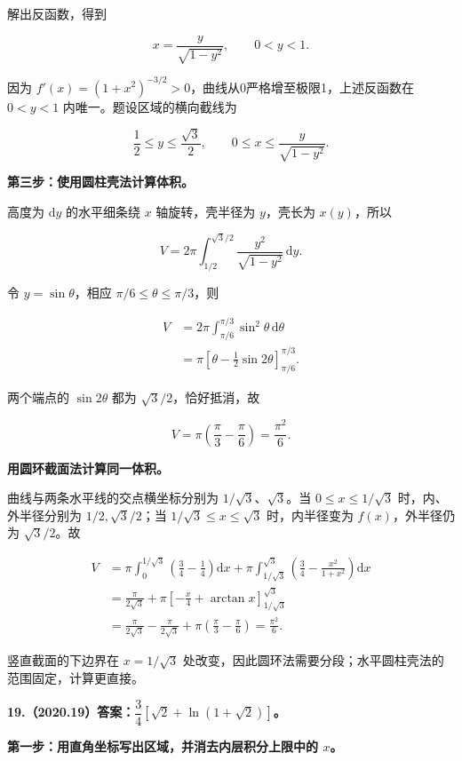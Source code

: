 \documentclass[UTF8,11pt,fontset=windows]{ctexart}
\begin{document}
解出反函数，得到

$$
x=\frac{y}{\sqrt{1-y^2}},\qquad0<y<1.
$$

因为 $f'(x)=(1+x^2)^{-3/2}>0$，曲线从0严格增至极限1，上述反函数在 $0<y<1$ 内唯一。题设区域的横向截线为

$$
\frac12\le y\le\frac{\sqrt3}{2},\qquad
0\le x\le\frac{y}{\sqrt{1-y^2}}.
$$

\textbf{第三步：使用圆柱壳法计算体积。}

高度为 $\mathrm dy$ 的水平细条绕 $x$ 轴旋转，壳半径为 $y$，壳长为 $x(y)$，所以

$$
V=2\pi\int_{1/2}^{\sqrt3/2}\frac{y^2}{\sqrt{1-y^2}}\,\mathrm dy.
$$

令 $y=\sin\theta$，相应 $\pi/6\le\theta\le\pi/3$，则

$$
\begin{aligned}
V&=2\pi\int_{\pi/6}^{\pi/3}\sin^2\theta\,\mathrm d\theta\\
&=\pi\left[\theta-\frac12\sin2\theta\right]_{\pi/6}^{\pi/3}.
\end{aligned}
$$

两个端点的 $\sin2\theta$ 都为 $\sqrt3/2$，恰好抵消，故

$$
V=\pi\left(\frac\pi3-\frac\pi6\right)=\frac{\pi^2}{6}.
$$

\textbf{用圆环截面法计算同一体积。}

曲线与两条水平线的交点横坐标分别为 $1/\sqrt3$、$\sqrt3$。当 $0\le x\le1/\sqrt3$ 时，内、外半径分别为 $1/2,\sqrt3/2$；当 $1/\sqrt3\le x\le\sqrt3$ 时，内半径变为 $f(x)$，外半径仍为 $\sqrt3/2$。故

$$
\begin{aligned}
V&=\pi\int_0^{1/\sqrt3}\left(\frac34-\frac14\right)\mathrm dx
 +\pi\int_{1/\sqrt3}^{\sqrt3}\left(\frac34-\frac{x^2}{1+x^2}\right)\mathrm dx\\
&=\frac{\pi}{2\sqrt3}
 +\pi\left[-\frac x4+\arctan x\right]_{1/\sqrt3}^{\sqrt3}\\
&=\frac{\pi}{2\sqrt3}-\frac{\pi}{2\sqrt3}
 +\pi\left(\frac\pi3-\frac\pi6\right)=\frac{\pi^2}{6}.
\end{aligned}
$$

竖直截面的下边界在 $x=1/\sqrt3$ 处改变，因此圆环法需要分段；水平圆柱壳法的范围固定，计算更直接。

\clearpage

\textbf{19.（2020.19）答案：$\dfrac34[\sqrt2+\ln(1+\sqrt2)]$。}

\textbf{第一步：用直角坐标写出区域，并消去内层积分上限中的 $x$。}
\end{document}

